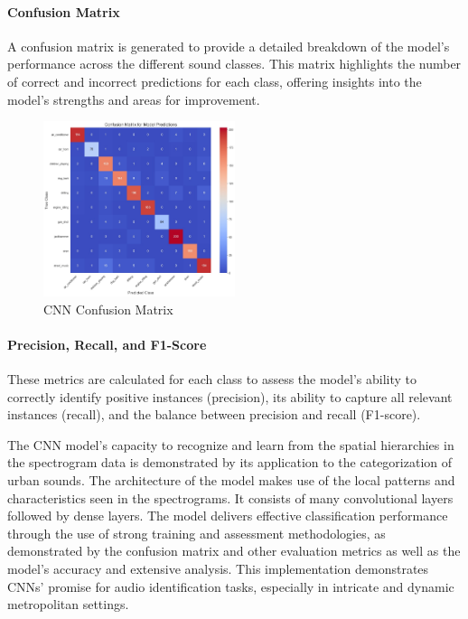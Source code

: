 \documentclass[conference]{IEEEtran}
\begin{document}
\paragraph{Confusion Matrix}
A confusion matrix is generated to provide a detailed breakdown of the model's performance across the different sound classes. This matrix highlights the number of correct and incorrect predictions for each class, offering insights into the model's strengths and areas for improvement.

\begin{figure}[htbp]
\centerline{\includegraphics[width=0.5\textwidth]{Images/CNNconfusion.png}}
\caption{CNN Confusion Matrix}
\label{fig:LSTMconfusion}
\end{figure}

\paragraph{Precision, Recall, and F1-Score}
These metrics are calculated for each class to assess the model's ability to correctly identify positive instances (precision), its ability to capture all relevant instances (recall), and the balance between precision and recall (F1-score).

The CNN model's capacity to recognize and learn from the spatial hierarchies in the spectrogram data is demonstrated by its application to the categorization of urban sounds.\cite{Sharma} The architecture of the model makes use of the local patterns and characteristics seen in the spectrograms. It consists of many convolutional layers followed by dense layers. The model delivers effective classification performance through the use of strong training and assessment methodologies, as demonstrated by the confusion matrix and other evaluation metrics as well as the model's accuracy and extensive analysis. This implementation demonstrates CNNs' promise for audio identification tasks, especially in intricate and dynamic metropolitan settings.
\end{document}

